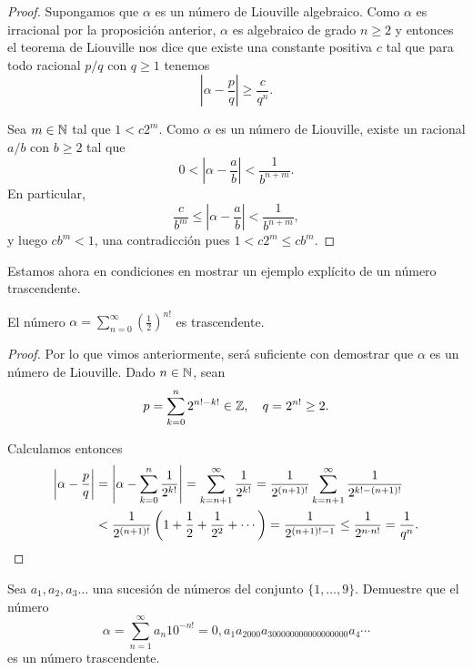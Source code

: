 \begin{proof}
	Supongamos que $\alpha$ es un número de Liouville algebraico. Como $\alpha$
	es irracional por la proposición anterior, $\alpha$ es algebraico de grado $n\geq2$ y entonces el
	teorema de Liouville nos dice que existe una constante positiva $c$ tal que
	para todo racional $p/q$ con $q\geq1$ tenemos 
	\[
		\left|\alpha-\frac{p}{q}\right|\geq \frac{c}{q^n}.
	\]

	Sea $m\in\mathbb{N}$ tal que $1<c2^m$. Como $\alpha$ es un número de Liouville,
	existe un racional $a/b$ con $b\geq2$ tal que
	\[
		0<\left|\alpha-\frac{a}{b}\right|<\frac{1}{b^{n+m}}.
	\]
	En particular, 
	\[
		\frac{c}{b^m}\leq\left|\alpha-\frac{a}{b}\right|<\frac{1}{b^{n+m}},
	\]
	y luego $cb^m<1$, una contradicción pues $1<c2^m\leq cb^m$.
\end{proof}

Estamos ahora en condiciones en mostrar un ejemplo explícito de un número trascendente. 

\begin{theorem}
	El número
	$\alpha=\displaystyle{\sum_{n=0}^{\infty}\left(\frac12\right)^{n!}}$ es
	trascendente.
\end{theorem}

\begin{proof}
	Por lo que vimos anteriormente, será suficiente con demostrar que $\alpha$
	es un número de Liouville. Dado $n\in\mathbb{N}$, sean
	\[
		p=\sum_{k=0}^n 2^{n!-k!}\in\mathbb{Z},
		\quad
		q=2^{n!}\geq2.
	\]

	Calculamos entonces 
	\begin{align*}
		\left|\alpha-\frac{p}{q}\right|&=
		\left|\alpha-\sum_{k=0}^n\frac{1}{2^{k!}}\right|
		=\sum_{k=n+1}^{\infty}\frac{1}{2^{k!}}
		=\frac{1}{2^{(n+1)!}}\sum_{k=n+1}^\infty \frac{1}{2^{k!-(n+1)!}}\\
		&<\frac{1}{2^{(n+1)!}}\left(1+\frac12+\frac{1}{2^2}+\cdots\right)
		=\frac{1}{2^{(n+1)!-1}}
		\leq\frac{1}{2^{n\cdot n!}}=\frac{1}{q^n}.\qedhere
	\end{align*}
\end{proof}

\begin{exercise}
	Sea $a_1,a_2,a_3\dots$ una sucesión de números del conjunto $\{1,\dots,9\}$. 
	Demuestre que el número
	\[
		\alpha=\sum_{n=1}^{\infty}a_n10^{-n!}=0,a_1a_2000a_300000000000000000a_4\cdots
	\]
	es un número
	trascendente.
\end{exercise}

